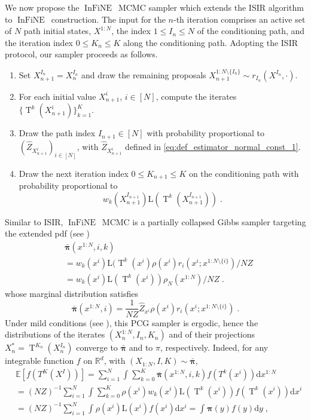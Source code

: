 \documentclass{article}
\def\IFIS{\ensuremath{\operatorname{InFiNE}}}
\def\transfo{\operatorname{T}}
\def\rmd{\operatorname{d}\hspace{-2pt}}
\def\PE{\mathbb{E}}
\def\rset{\mathbb{R}}
\newcommand{\chunk}[3]{#1_{#2:#3}}
\def\rmd{\mathrm{d}}
\def\eqsp{\,}
\def\eqsp{\;}
\newcommand{\1}{\mathds{1}}
\def\w{w}
\def\target{\pi}
\def\proposal{\rho}
\newcommand{\chunku}[3]{#1^{#2:#3}}
\newcommand{\chunkum}[4]{#1^{#2:#3 \setminus \{#4\}}}
\def\const{Z}
\newcommand{\estConstC}[1]{\widehat{Z}_{#1}}
\def\measpi{\boldsymbol{\pi}}
\def\rset{\mathbb{R}}
\def\rmd{\mathrm{d}}
\def\likelihood{\mathrm{L}}
\begin{document}
 We now propose the \IFIS\ MCMC sampler which extends the ISIR algorithm to \IFIS\ construction.  The input for the $n$-th iteration comprises an active set  of $N$ path initial states,  $\chunku{X}{1}{N}$, the index $1\le I_n\le N$ of the conditioning path, and the iteration index $0\le K_n\le K$ along the conditioning path.
Adopting the ISIR protocol, our sampler proceeds as follows.
\begin{enumerate}
\item Set  $X_{n+1}^{I_n}= X_n^{I_n}$ and draw the remaining proposals $\chunkum{X_{n+1}}{1}{N}{I_{n}} \sim r_{I_n}(X^{I_n},\cdot)$.
\item For each initial value $X_{n+1}^i$, $i \in [N]$, compute the iterates $\{ \transfo^k(X_{n+1}^i) \}_{k=1}^K$.
\item Draw the path index $I_{n+1}  \in [N]$  with probability proportional to  $(\estConstC{X_{n+1}^{i}})_{i \in [N]}$, with $\estConstC{X_{n+1}^{i}}$ defined in  \eqref{eq:def_estimator_normal_const_1}.
\item Draw the next iteration  index $0\le K_{n+1} \le K$ on the conditioning path with probability proportional to
\[
\w_k(X^{I_{n+1}}_{n+1})\likelihood(\transfo^k(X^{I_{n+1}}_{n+1})) \eqsp.
\]
\end{enumerate}
Similar to ISIR, \IFIS\ MCMC is a partially collapsed Gibbs sampler targeting the extended pdf (see ) 
\begin{align}\label{eq:def_measpi_N}
\nonumber
&  \bar{\measpi}(x^{1:N},i,k) \\
\nonumber
  &= {\w_k(x^i)\likelihood(\transfo^{k}(x^i) \proposal(x^i) r_i(x^i;\chunkum{x}{1}{N}{i})}\big/{N \const} \\
  &= {\w_k(x^i)\likelihood(\transfo^{k}(x^i)
  )}\proposal_N(\chunku{x}{1}{N})\big/{N \const}
   \eqsp.
\end{align}
whose marginal distribution satisfies
\[
\bar{\measpi}(\chunku{x}{1}{N},i)=\frac{1}{N \const}  \estConstC{x^i} \proposal(x^i) r_i(x^i;\chunkum{x}{1}{N}{i})\eqsp.
\]
Under mild conditions (see ), this PCG sampler is ergodic, hence the distributions of the iterates $(\chunku{X_n}{1}{N},I_n,K_n)$ and of their projections $X^*_n=\transfo^{K_{n}}(X_n^{I_n})$ converge to $\bar{\measpi}$ and to $\target$, respectively. Indeed, for any integrable function $f$ on $\rset^d$, with $(\chunk{X}{1}{N},I,K)\sim \bar{\measpi}$,
 \begin{align*}
    & \PE[f(T^K(X^I))]= \sum_{i=1}^N\int_{}\sum_{k=0}^K\bar{\measpi}(x^{1:N},i,k)f(T^k(x^i))
    \rmd \chunku{x}{1}{N}  \\
    &=(N \const)^{-1}\! \sum_{i=1}^N\!\int_{}\sum_{k=0}^K   \rho(x^i) \w_k(x^i)  \likelihood(\transfo^{k}(x^i))f(\transfo^k(x^i)) \rmd x^i
    \\
    & = (N \const)^{-1} \sum_{i=1}^N\int_{} \rho(x^i) \likelihood(x^i)f(x^i) \rmd x^i = \int_{} \measpi(y)f(y) \rmd y \eqsp,
\end{align*}
\end{document}
